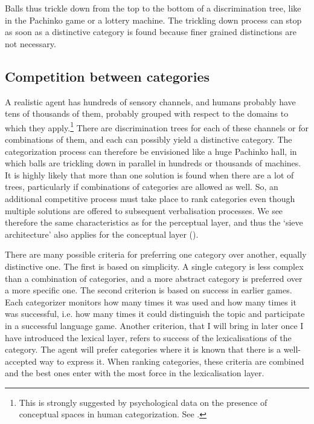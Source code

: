 Balls thus trickle down from the top to the bottom of 
a discrimination tree, like in the Pachinko game or 
a lottery machine. The trickling down process can stop as
soon as a distinctive category is found because finer grained 
distinctions are not necessary. 

\subsection{Competition between categories}

A realistic agent has hundreds of sensory
channels, and humans probably have tens of thousands
of them, probably grouped with respect to the domains
to which they apply.\footnote{
This is strongly suggested by psychological 
data on the presence of conceptual spaces in human 
categorization. See \cite{Gardenfors:1999}.} There are discrimination trees
for each of 
these channels or for combinations of them, and 
each can possibly yield a distinctive
category. The categorization process can therefore be
envisioned like a huge Pachinko hall, in which
balls are trickling down in parallel in hundreds or 
thousands of machines. It is highly 
likely that more than one solution is found
when there are a lot of trees, particularly 
if combinations of categories are allowed as well. 
So, an additional competitive process must 
take place to rank categories even 
though multiple solutions are offered to subsequent
verbalisation processes. We see therefore the same
characteristics as for the perceptual layer, and thus
the `sieve architecture' also 
applies for the conceptual layer (). 
 
There are many possible criteria for preferring 
one category over another, equally distinctive one. 
The first is based on 
simplicity. A single category is less complex than 
a combination of categories, and a more abstract category 
is preferred over a more specific one. 
The second criterion is based on success in earlier games. 
Each categorizer monitors how many
times it was used and how many times
it was successful, i.e. how many times it could distinguish
the topic and participate in a successful language game. 
Another criterion, that I will bring in later 
once I have introduced the lexical layer, refers to 
success of the lexicalisations of the category. The agent 
will prefer categories where it is known that there is
a well-accepted way to express it. 
When ranking categories, these criteria are combined
and the best ones enter with the most force in the 
lexicalisation layer. 

